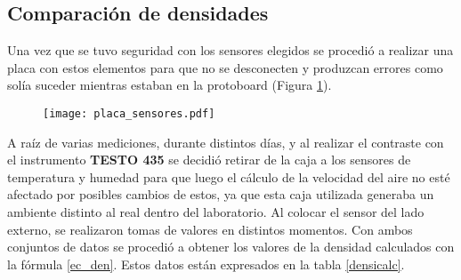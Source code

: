 \subsection{Comparación de densidades} \label{cap:densidades}

Una vez que se tuvo seguridad con los sensores elegidos se procedió a realizar una placa con estos elementos para que no se desconecten y produzcan errores como solía suceder mientras estaban en la protoboard (Figura \ref{fig:sensoresa}). \\
\begin{figure}[H]
	\centering
	\texttt{[image: placa\_sensores.pdf]}
	\label{fig:sensoresa}
\end{figure}

A raíz de varias mediciones, durante distintos días, y al realizar el contraste con el instrumento \textbf{TESTO 435} se decidió retirar de la caja a los sensores de temperatura y humedad para que luego el cálculo de la velocidad del aire no esté afectado por posibles cambios de estos, ya que esta caja utilizada generaba un ambiente distinto al real dentro del laboratorio. Al colocar el sensor del lado externo, se realizaron tomas de valores en distintos momentos. Con ambos conjuntos de datos se procedió a obtener los valores de la densidad calculados con la fórmula \ref{ec_den}. Estos datos están expresados en la tabla \ref{densicalc}. 


